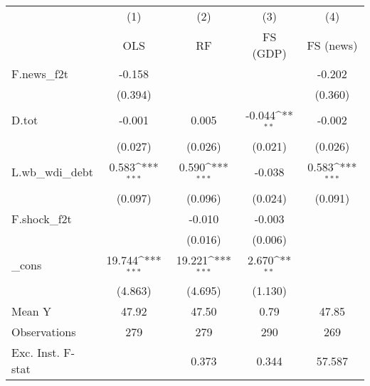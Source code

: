 {
\def\sym#1{\ifmmode^{#1}\else\(^{#1}\)\fi}
\begin{tabular}{l*{4}{c}}
\toprule
            &\multicolumn{1}{c}{(1)}&\multicolumn{1}{c}{(2)}&\multicolumn{1}{c}{(3)}&\multicolumn{1}{c}{(4)}\\
            &\multicolumn{1}{c}{OLS}&\multicolumn{1}{c}{RF}&\multicolumn{1}{c}{FS (GDP)}&\multicolumn{1}{c}{FS (news)}\\
\midrule
F.news\_f2t  &      -0.158         &                     &                     &      -0.202         \\
            &     (0.394)         &                     &                     &     (0.360)         \\
\addlinespace
D.tot       &      -0.001         &       0.005         &      -0.044\sym{**} &      -0.002         \\
            &     (0.027)         &     (0.026)         &     (0.021)         &     (0.026)         \\
\addlinespace
L.wb\_wdi\_debt&       0.583\sym{***}&       0.590\sym{***}&      -0.038         &       0.583\sym{***}\\
            &     (0.097)         &     (0.096)         &     (0.024)         &     (0.091)         \\
\addlinespace
F.shock\_f2t &                     &      -0.010         &      -0.003         &                     \\
            &                     &     (0.016)         &     (0.006)         &                     \\
\addlinespace
\_cons      &      19.744\sym{***}&      19.221\sym{***}&       2.670\sym{**} &                     \\
            &     (4.863)         &     (4.695)         &     (1.130)         &                     \\
\midrule
Mean Y      &       47.92         &       47.50         &        0.79         &       47.85         \\
Observations&         279         &         279         &         290         &         269         \\
Exc. Inst. F-stat&                     &       0.373         &       0.344         &      57.587         \\
\bottomrule
\end{tabular}
}
